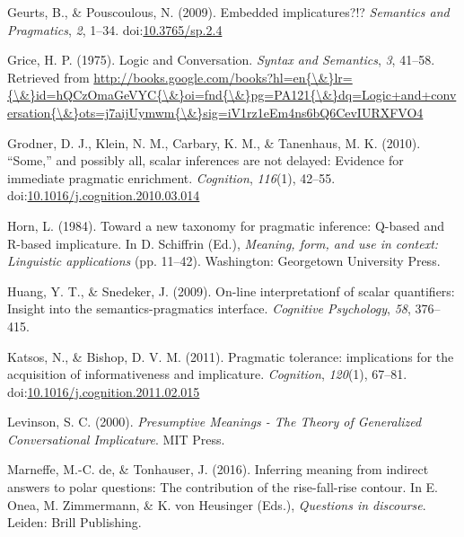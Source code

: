 \documentclass[floatsintext,man]{apa6}
\theoremstyle{definition}
\theoremstyle{definition}
\theoremstyle{definition}
\theoremstyle{remark}
\begin{document}
\hypertarget{ref-Geurts2009}{}
Geurts, B., \& Pouscoulous, N. (2009). Embedded implicatures?!?
\emph{Semantics and Pragmatics}, \emph{2}, 1--34.
doi:\href{https://doi.org/10.3765/sp.2.4}{10.3765/sp.2.4}

\hypertarget{ref-grice1975}{}
Grice, H. P. (1975). Logic and Conversation. \emph{Syntax and
Semantics}, \emph{3}, 41--58. Retrieved from
\href{http://books.google.com/books?hl=en\%7B/\&\%7Dlr=\%7B/\&\%7Did=hQCzOmaGeVYC\%7B/\&\%7Doi=fnd\%7B/\&\%7Dpg=PA121\%7B/\&\%7Ddq=Logic+and+conversation\%7B/\&\%7Dots=j7aijUymwm\%7B/\&\%7Dsig=iV1rz1eEm4ns6bQ6CevIURXFVO4}{http://books.google.com/books?hl=en\{\textbackslash{}\&\}lr=\{\textbackslash{}\&\}id=hQCzOmaGeVYC\{\textbackslash{}\&\}oi=fnd\{\textbackslash{}\&\}pg=PA121\{\textbackslash{}\&\}dq=Logic+and+conversation\{\textbackslash{}\&\}ots=j7aijUymwm\{\textbackslash{}\&\}sig=iV1rz1eEm4ns6bQ6CevIURXFVO4}

\hypertarget{ref-Grodner2010}{}
Grodner, D. J., Klein, N. M., Carbary, K. M., \& Tanenhaus, M. K.
(2010). ``Some,'' and possibly all, scalar inferences are not delayed:
Evidence for immediate pragmatic enrichment. \emph{Cognition},
\emph{116}(1), 42--55.
doi:\href{https://doi.org/10.1016/j.cognition.2010.03.014}{10.1016/j.cognition.2010.03.014}

\hypertarget{ref-horn1984}{}
Horn, L. (1984). Toward a new taxonomy for pragmatic inference: Q-based
and R-based implicature. In D. Schiffrin (Ed.), \emph{Meaning, form, and
use in context: Linguistic applications} (pp. 11--42). Washington:
Georgetown University Press.

\hypertarget{ref-huang2009}{}
Huang, Y. T., \& Snedeker, J. (2009). On-line interpretationf of scalar
quantifiers: Insight into the semantics-pragmatics interface.
\emph{Cognitive Psychology}, \emph{58}, 376--415.

\hypertarget{ref-Katsos2011}{}
Katsos, N., \& Bishop, D. V. M. (2011). Pragmatic tolerance:
implications for the acquisition of informativeness and implicature.
\emph{Cognition}, \emph{120}(1), 67--81.
doi:\href{https://doi.org/10.1016/j.cognition.2011.02.015}{10.1016/j.cognition.2011.02.015}

\hypertarget{ref-levinson2000}{}
Levinson, S. C. (2000). \emph{Presumptive Meanings - The Theory of
Generalized Conversational Implicature}. MIT Press.

\hypertarget{ref-DeMarneffe2017}{}
Marneffe, M.-C. de, \& Tonhauser, J. (2016). Inferring meaning from
indirect answers to polar questions: The contribution of the
rise-fall-rise contour. In E. Onea, M. Zimmermann, \& K. von Heusinger
(Eds.), \emph{Questions in discourse}. Leiden: Brill Publishing.
\end{document}
